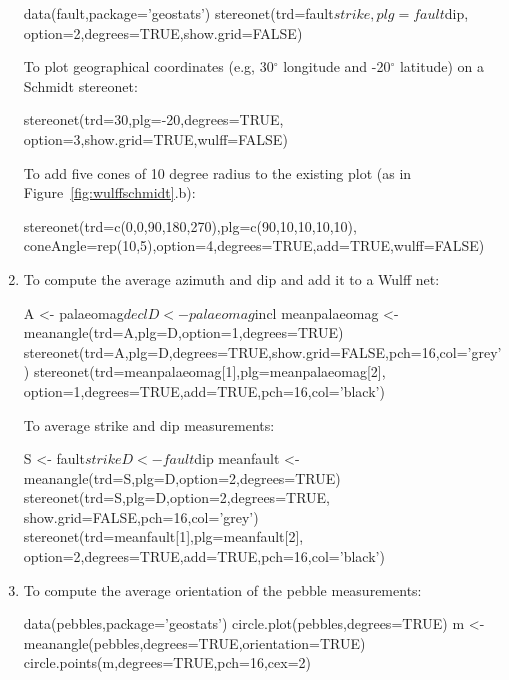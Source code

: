 \begin{enumerate}
\begin{script}
data(fault,package='geostats')
stereonet(trd=fault$strike,plg=fault$dip,
          option=2,degrees=TRUE,show.grid=FALSE)
\end{script}

To plot geographical coordinates (e.g, 30$^\circ$ longitude and
-20$^\circ$ latitude) on a Schmidt stereonet:

\begin{script}
stereonet(trd=30,plg=-20,degrees=TRUE,
          option=3,show.grid=TRUE,wulff=FALSE)
\end{script}

To add five cones of 10 degree radius to the existing plot (as in
Figure~\ref{fig:wulffschmidt}.b):

\begin{script}[firstnumber=3]
stereonet(trd=c(0,0,90,180,270),plg=c(90,10,10,10,10),
          coneAngle=rep(10,5),option=4,degrees=TRUE,add=TRUE,wulff=FALSE)
\end{script}

\item To compute the average azimuth and dip and add it to a Wulff net:

\begin{script}
A <- palaeomag$decl
D <- palaeomag$incl
meanpalaeomag <- meanangle(trd=A,plg=D,option=1,degrees=TRUE)
stereonet(trd=A,plg=D,degrees=TRUE,show.grid=FALSE,pch=16,col='grey')
stereonet(trd=meanpalaeomag[1],plg=meanpalaeomag[2],
          option=1,degrees=TRUE,add=TRUE,pch=16,col='black')
\end{script}

To average strike and dip measurements:

\begin{script}
S <- fault$strike
D <- fault$dip
meanfault <- meanangle(trd=S,plg=D,option=2,degrees=TRUE)
stereonet(trd=S,plg=D,option=2,degrees=TRUE,
          show.grid=FALSE,pch=16,col='grey')
stereonet(trd=meanfault[1],plg=meanfault[2],
          option=2,degrees=TRUE,add=TRUE,pch=16,col='black')
\end{script}

\item To compute the average orientation of the pebble measurements:

\begin{script}
data(pebbles,package='geostats')
circle.plot(pebbles,degrees=TRUE)
m <- meanangle(pebbles,degrees=TRUE,orientation=TRUE)
circle.points(m,degrees=TRUE,pch=16,cex=2)
\end{script}  

\end{enumerate}


